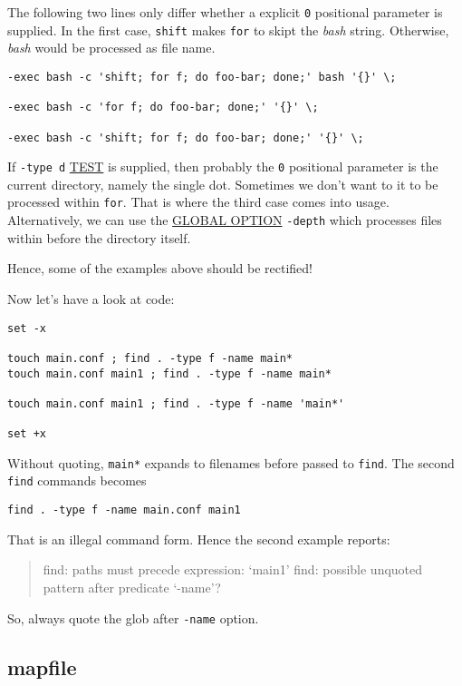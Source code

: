 The following two lines only differ whether a explicit \verb|0|
positional parameter is supplied. In the first case,
\lstinline|shift| makes \lstinline|for| to skipt the \textit{bash}
string. Otherwise, \textit{bash} would be processed as file name.

\begin{lstlisting}
-exec bash -c 'shift; for f; do foo-bar; done;' bash '{}' \;

-exec bash -c 'for f; do foo-bar; done;' '{}' \;

-exec bash -c 'shift; for f; do foo-bar; done;' '{}' \;
\end{lstlisting}

If \lstinline|-type d| \uline{TEST} is supplied, then probably the
\verb|0| positional parameter is the current directory, namely the
single dot. Sometimes we don't want to it to be processed within
\lstinline|for|. That is where the third case comes into
usage. Alternatively, we can use the \uline{GLOBAL OPTION}
\lstinline|-depth| which processes files within before the
directory itself.

Hence, some of the examples above should be rectified!


Now let's have a look at code:

\begin{lstlisting}
set -x

touch main.conf ; find . -type f -name main*
touch main.conf main1 ; find . -type f -name main*

touch main.conf main1 ; find . -type f -name 'main*'

set +x
\end{lstlisting}

Without quoting, \verb|main*| expands to filenames before passed
to \lstinline|find|. The second \lstinline|find| commands becomes

\begin{lstlisting}
find . -type f -name main.conf main1
\end{lstlisting}

That is an illegal command form. Hence the second example reports:

\begin{quotation}
  find: paths must precede expression: `main1'
  find: possible unquoted pattern after predicate `-name'?
\end{quotation}

So, always quote the glob after \lstinline|-name| option.

\subsection{mapfile}
\label{sec:bash-mapfile}

